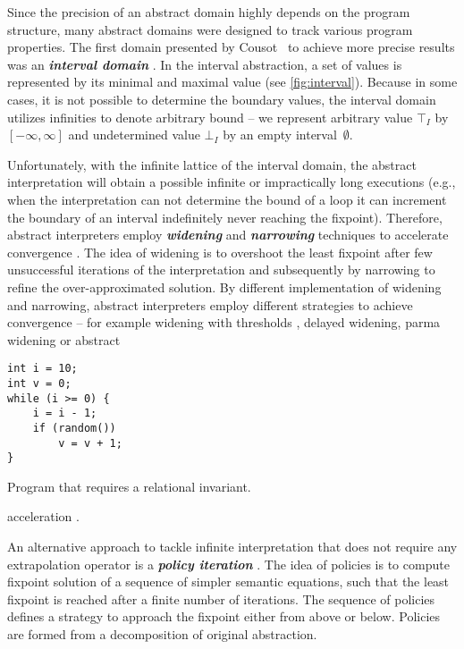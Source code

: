 Since the precision of an abstract domain highly depends on the program
structure, many abstract domains were designed to track various program
properties. The first domain presented by Cousot~\cite{Cousot1977} to
achieve more precise results was an \textbf{\emph{interval domain}} .
In the interval abstraction, a set of values is represented by its minimal and
maximal value (see \autoref{fig:interval}).  Because in some cases, it is not
possible to determine the boundary values, the interval domain utilizes
infinities to denote arbitrary bound -- we represent arbitrary value
$\top_{\textit{I}}$ by $[-\infty, \infty]$ and undetermined value
$\bot_{\textit{I}}$ by an empty interval~$\emptyset$.

Unfortunately, with the infinite lattice of the interval
domain, the
abstract interpretation will obtain a possible infinite or impractically long
executions (e.g., when the interpretation can not determine the bound of a loop
it can increment the boundary of an interval indefinitely never reaching the
fixpoint). Therefore, abstract interpreters employ \textbf{\emph{widening}} and
\textbf{\emph{narrowing}} techniques to accelerate convergence \cite{Cousot1992a,
Cortesi2011}.  The idea of wi\-de\-ning is to overshoot the least fixpoint
after few unsuccessful iterations of the interpretation and subsequently by
narrowing to refine the over-approximated solution. By different implementation
of widening and narrowing, abstract interpreters employ different strategies to
achieve convergence -- for example widening with thresholds \cite{Blanchet2003,
Lakhdar2011}, delayed widening, parma widening \cite{Bagnara2008} or abstract
\begin{marginfigure}
\begin{verbatim}
int i = 10;
int v = 0;
while (i >= 0) {
    i = i - 1;
    if (random())
        v = v + 1;
}
\end{verbatim}
    \caption{Program that requires a relational invariant.}
    \label{fig:relationalc}
\end{marginfigure}
acceleration \cite{Gonnord2006, Feautrier2010}.

An alternative approach to tackle infinite interpretation that does not require
any extrapolation operator is a \textbf{\emph{policy iteration}}
\cite{Costan2005, Gaubert2007, Gawlitza2007, Gawlitza2007b, Gawlitza2011}. The
idea of policies is to compute fixpoint solution of a sequence of simpler
semantic equations, such that the least fixpoint is reached after a finite
number of iterations.  The sequence of policies defines a strategy to approach
the fixpoint either from above or below. Policies are formed from a
decomposition of original abstraction.

